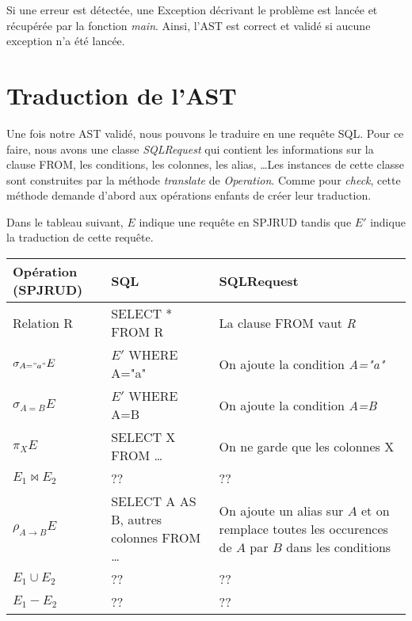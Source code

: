 \documentclass[]{article}
\begin{document}
Si une erreur est d\'etect\'ee, une Exception d\'ecrivant le probl\`eme est lanc\'ee et r\'ecup\'er\'ee par la fonction \textit{main}. Ainsi, l'AST est correct et valid\'e si aucune exception n'a \'et\'e lanc\'ee.

\section{Traduction de l'AST}
Une fois notre AST valid\'e, nous pouvons le traduire en une requ\^ete SQL. Pour ce faire, nous avons une classe \textit{SQLRequest} qui contient les informations sur la clause FROM, les conditions, les colonnes, les alias, \ldots Les instances de cette classe sont construites par la m\'ethode \textit{translate} de \textit{Operation}. Comme pour \textit{check}, cette m\'ethode demande d'abord aux op\'erations enfants de cr\'eer leur traduction.

Dans le tableau suivant, $E$ indique une requ\^ete en SPJRUD tandis que $E'$ indique la traduction de cette requ\^ete.

\begin{tabular}{| l | p{100px} | p{100px} |}
	\hline
	Op\'eration (SPJRUD) & SQL & SQLRequest\\
	\hline
	Relation R & SELECT * FROM R & La clause FROM vaut \textit{R}\\
	\hline
	$\sigma_{A="a"} E$ & $E'$ WHERE A="a" & On ajoute la condition \textit{A="a"}\\
	\hline
	$\sigma_{A=B} E$ & $E'$ WHERE A=B & On ajoute la condition \textit{A=B}\\
	\hline
	$\pi_X E$ & SELECT X FROM \ldots & On ne garde que les colonnes X\\
	\hline
	$E_1 \bowtie E_2$ & ?? & ??\\
	\hline
	$\rho_{A \to B} E$ & SELECT A AS B, autres colonnes FROM \ldots & On ajoute un alias sur $A$ et on remplace toutes les occurences de $A$ par $B$ dans les conditions\\
	\hline
	$E_1 \cup E_2$ & ?? & ??\\
	\hline
	$E_1 - E_2$ & ?? & ??\\
	\hline
\end{tabular}
\end{document}

